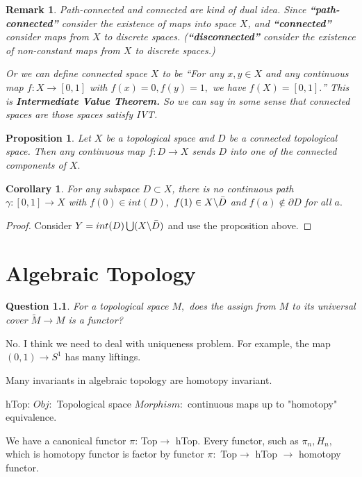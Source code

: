 \documentclass{book}
\newtheorem{cor}[defi]{Corollary}
\newtheorem*{remark}{Remark}
\newtheorem{prop}[defi]{Proposition}
\newtheorem{q}[defi]{Question}
\numberwithin{equation}{section}
\begin{document}
\begin{remark}
Path-connected and connected are kind of dual idea. Since \textbf{``path-connected''} consider the existence of maps into space $X$, and \textbf{``connected''} consider maps from $X$ to discrete spaces. (\textbf{``disconnected''} consider the existence of non-constant maps from $X$ to discrete spaces.)\medskip

Or we can define connected space $X$ to be ``For any $x,y\in X$ and any continuous map $f: X\rightarrow [0,1]$ with $f(x)=0, f(y)=1,$ we have $f(X)=[0,1].$'' This is \textbf{Intermediate Value Theorem.} So we can say in some sense that connected spaces are those spaces satisfy IVT. 
\end{remark}

\begin{prop}
Let $X$ be a topological space and $D$ be a connected topological space. Then any continuous map $f: D \rightarrow X$ sends $D$ into one of the connected components of $X.$
\end{prop}

\begin{cor}
For any subspace $D\subset X$, there is no continuous path $\gamma : [0,1] \rightarrow X$ with $f(0)\in int(D),$ $f(1)\in X\backslash \Bar{D}$ and $f(a)\not\in \partial D$ for all $a.$  
\end{cor}
\begin{proof}
Consider $Y=int(D) \bigcup (X\backslash \Bar{D})$ and use the proposition above. 
\end{proof}

\chapter{Algebraic Topology}
\begin{q}
For a topological space $M,$ does the assign from $M$ to its universal cover $\widetilde{M}\rightarrow M$ is a functor?
\end{q} No. I think we need to deal with uniqueness problem. For example, the map $(0,1)\rightarrow S^1$ has many liftings.\medskip

Many invariants in algebraic topology are homotopy invariant. \medskip

hTop: $Obj:$ Topological space $Morphism :$ continuous maps up to "homotopy" equivalence.\medskip

We have a canonical functor $\pi$: Top$\rightarrow$ hTop. Every functor, such as $\pi_n, H_n,$ which is homotopy functor is factor by functor $\pi:$ Top$\rightarrow$ hTop $\rightarrow$ homotopy functor. \medskip
\end{document}
